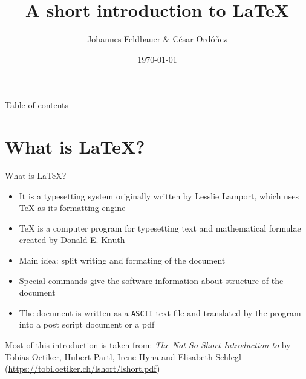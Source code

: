\documentclass[presentation, aspectratio=1610]{beamer}
\title[Introduction to \LaTeX]{A short introduction to \LaTeX}
\author[J.Feldbauer, C. Ordóñez]{Johannes Feldbauer \& César Ordóñez}
\date{\today}
\begin{document}
\maketitle

\begin{frame}{Table of contents}
  \begin{minipage}[c][.75\textheight]{0.6\textwidth}
    \tableofcontents
  \end{minipage}
  \begin{minipage}{0.25\textwidth}
  \end{minipage}
\end{frame}

\section{What is \LaTeX ?}
\begin{frame}{What is \LaTeX ?}
  \begin{itemize}[<+->]
    \item It is a typesetting system originally written by Lesslie Lamport, which uses \TeX{}  as its formatting engine
    \item \TeX{} is a computer program for typesetting text and mathematical formulae created by Donald E. Knuth
    \item Main idea: split writing and formating of the document
    \item Special commands give the software information about structure of the document
    \item The document is written as a \texttt{ASCII} text-file and translated by the program into a post script document or a pdf
  \end{itemize}
  \vfill
  \begin{block}{}
    {\footnotesize Most of this introduction is taken from: \textit{The Not So Short Introduction to \LaTeXe} by
    Tobias Oetiker, Hubert Partl, Irene Hyna and Elisabeth Schlegl (\url{https://tobi.oetiker.ch/lshort/lshort.pdf})}
  \end{block}
\end{frame}
\end{document}
